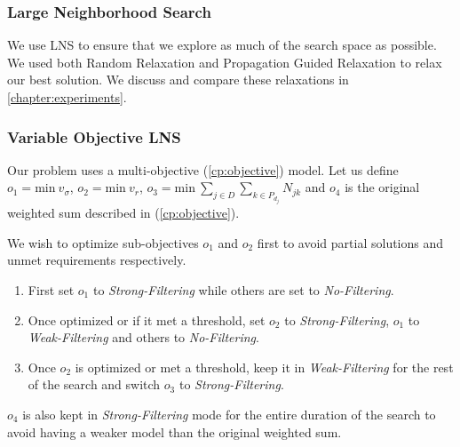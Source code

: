 \documentclass[../../thesis.tex]{subfiles}
\begin{document}
\subsubsection{Large Neighborhood Search}

We use LNS to ensure that we explore as much of the search space as possible. 
We used both Random Relaxation and Propagation Guided Relaxation \cite{Propagation:LNS} to relax 
our best solution. We discuss and compare these relaxations in \autoref{chapter:experiments}.


\subsubsection{Variable Objective LNS}
\label{cp:volns}

Our problem uses a multi-objective (\ref{cp:objective}) model. 
Let us define $o_1 = \text{min} \ v_{\sigma}$, $o_2 = {\text{min} \ v_r}$, $o_3 = {\text{min} \ \sum_{j \in D} \sum_{k \in P_{d_j}} N_{jk}}$
and $o_4$ is the original weighted sum described in (\ref{cp:objective}).


We wish to optimize sub-objectives $o_1$ and $o_2$ first to avoid partial solutions and unmet requirements respectively. 

\begin{enumerate}
  \item First set $o_1$ to \emph{Strong-Filtering} while others are set to \emph{No-Filtering}.
  \item Once optimized or if it met a threshold, set $o_2$ to \emph{Strong-Filtering}, $o_1$ to \emph{Weak-Filtering} and others to \emph{No-Filtering}.
  \item Once $o_2$ is optimized or met a threshold, keep it in \emph{Weak-Filtering} for the rest of the search and switch $o_3$ to \emph{Strong-Filtering}.
\end{enumerate}

$o_4$ is also kept in \emph{Strong-Filtering} mode for the entire duration of the search to avoid having a weaker model than the original weighted sum.
\end{document}
